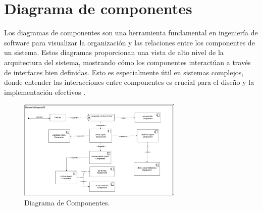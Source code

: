 \section{Diagrama de componentes}

Los diagramas de componentes son una herramienta fundamental en ingeniería de software para visualizar la organización y las relaciones entre los componentes de un sistema. Estos diagramas proporcionan una vista de alto nivel de la arquitectura del sistema, mostrando cómo los componentes interactúan a través de interfaces bien definidas. Esto es especialmente útil en sistemas complejos, donde entender las interacciones entre componentes es crucial para el diseño y la implementación efectivos \cite{Restackio2025}.

\begin{figure}[h]
	\centering
	\includegraphics[width=0.7\textwidth]{images/component.png}
	\caption{Diagrama de Componentes.}
	\label{fig:Diagrama de Componente.}
\end{figure}

